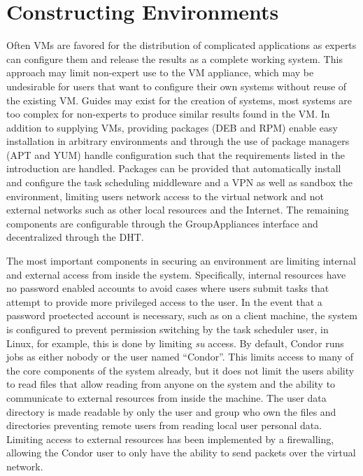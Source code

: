 \section{Constructing Environments}
Often VMs are favored for the distribution of complicated applications as
experts can configure them and release the results as a complete working system.
This approach may limit non-expert use to the VM appliance, which may be
undesirable for users that want to configure their own systems without reuse
of the existing VM.  Guides may exist for the creation of systems, most
systems are too complex for non-experts to produce similar results found in the
VM.  In addition to supplying VMs, providing packages (DEB and RPM) enable easy
installation in arbitrary environments and through the use of package
managers (APT and YUM) handle configuration such that the requirements listed
in the introduction are handled.  Packages can be provided that automatically
install and configure the task scheduling middleware and a VPN as well as
sandbox the environment, limiting users network access to the virtual network
and not external networks such as other local resources and the Internet.  The
remaining components are configurable through the GroupAppliances interface and
decentralized through the DHT.

The most important components in securing an environment are limiting internal
and external access from inside the system.  Specifically, internal resources
have no password enabled accounts to avoid cases where users submit tasks that
attempt to provide more privileged access to the user.  In the event that a
password proetected account is necessary, such as on a client machine, the system is
configured to prevent permission switching by the task scheduler user, in
Linux, for example, this is done by limiting \textit{su} access.  By default,
Condor runs jobs as either nobody or the user named ``Condor''.  This limits
access to many of the core components of the system already, but it does not
limit the users ability to read files that allow reading from anyone on the
system and the ability to communicate to external resources from inside the
machine.  The user data directory is made readable by only the user and group
who own the files and directories preventing remote users from reading local
user personal data.  Limiting access to external resources has been implemented
by a firewalling, allowing the Condor user to only have the ability to send
packets over the virtual network.

